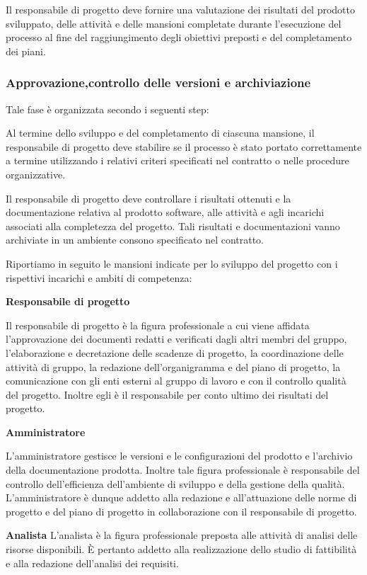 \myparagraph{}
Il responsabile di progetto deve fornire una valutazione dei risultati del prodotto sviluppato, delle attività e delle mansioni completate durante l'esecuzione del processo al fine del raggiungimento degli obiettivi preposti e del completamento dei piani.

\subsubsection{Approvazione,controllo delle versioni e archiviazione}
Tale fase è organizzata secondo i seguenti step:

\myparagraph{}
Al termine dello sviluppo e del completamento di ciascuna mansione, il responsabile di progetto deve stabilire se il processo è stato portato correttamente a termine utilizzando i relativi criteri specificati nel contratto o nelle procedure organizzative.

\myparagraph{}
Il responsabile di progetto deve controllare i risultati ottenuti e la documentazione relativa al prodotto software, alle attività e agli incarichi associati alla completezza del progetto. Tali risultati e documentazioni vanno archiviate in un ambiente consono specificato nel contratto.

Riportiamo in seguito le mansioni indicate per lo sviluppo del progetto con i rispettivi incarichi e ambiti di competenza:

\textbf{Responsabile di progetto}

Il responsabile di progetto è la figura professionale a cui viene affidata l'approvazione dei documenti redatti e verificati dagli altri membri del gruppo, l'elaborazione e decretazione delle scadenze di progetto, la coordinazione delle attività di gruppo, la redazione dell'organigramma e del piano di progetto, la comunicazione con gli enti esterni al gruppo di lavoro e con il controllo  qualità del progetto. Inoltre egli è il responsabile per conto ultimo dei risultati del progetto.

\textbf{Amministratore}

L'amministratore gestisce le versioni e le configurazioni del prodotto e l'archivio della documentazione prodotta. Inoltre tale figura professionale è responsabile del controllo dell'efficienza  dell'ambiente di sviluppo e della gestione della qualità. L'amministratore è dunque addetto alla redazione e all'attuazione delle norme di progetto e del piano di progetto in collaborazione con il responsabile di  progetto.

\textbf{Analista}
L'analista è la figura professionale preposta alle attività di analisi delle risorse disponibili. \`E pertanto addetto alla realizzazione dello studio di fattibilità e alla redazione dell'analisi dei requisiti.

